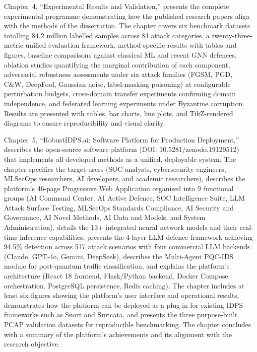 Chapter~4, ``Experimental Results and Validation,'' presents the complete experimental programme demonstrating how the published research papers align with the methods of the dissertation. The chapter covers six benchmark datasets totalling 84.2 million labelled samples across 84 attack categories, a twenty-three-metric unified evaluation framework, method-specific results with tables and figures, baseline comparisons against classical ML and recent GNN defences, ablation studies quantifying the marginal contribution of each component, adversarial robustness assessments under six attack families (FGSM, PGD, C\&W, DeepFool, Gaussian noise, label-masking poisoning) at configurable perturbation budgets, cross-domain transfer experiments confirming domain independence, and federated learning experiments under Byzantine corruption. Results are presented with tables, bar charts, line plots, and TikZ-rendered diagrams to ensure reproducibility and visual clarity.

Chapter~5, ``RobustIDPS.ai: Software Platform for Production Deployment,'' describes the open-source software platform (DOI: 10.5281/zenodo.19129512) that implements all developed methods as a unified, deployable system. The chapter specifies the target users (SOC analysts, cybersecurity engineers, MLSecOps researchers, AI developers, and academic researchers), describes the platform's 46-page Progressive Web Application organised into 9 functional groups (AI Command Center, AI Active Defence, SOC Intelligence Suite, LLM Attack Surface Testing, MLSecOps Standards Compliance, AI Security and Governance, AI Novel Methods, AI Data and Models, and System Administration), details the 13+ integrated neural network models and their real-time inference capabilities, presents the 4-layer LLM defence framework achieving 94.5\% detection across 517 attack scenarios with four commercial LLM backends (Claude, GPT-4o, Gemini, DeepSeek), describes the Multi-Agent PQC-IDS module for post-quantum traffic classification, and explains the platform's architecture (React 18 frontend, Flask/Python backend, Docker Compose orchestration, PostgreSQL persistence, Redis caching). The chapter includes at least six figures showing the platform's user interface and operational results, demonstrates how the platform can be deployed as a plug-in for existing IDPS frameworks such as Snort and Suricata, and presents the three purpose-built PCAP validation datasets for reproducible benchmarking. The chapter concludes with a summary of the platform's achievements and its alignment with the research objective.

